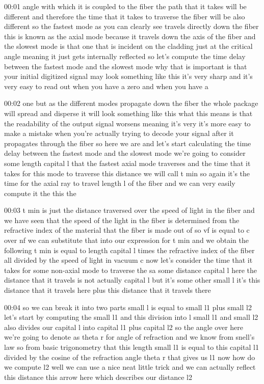 00:01
angle with which it is coupled to the fiber the path that it takes
will be different and therefore the time
that it takes to traverse the fiber will be also different
so the fastest mode as you can clearly see
travels directly down the fiber this is known as the axial mode
because it travels down the axis of the fiber and the slowest mode is
that one that is incident on the cladding just at the critical angle meaning it
just gets internally reflected so let's compute the time delay between
the fastest mode and the slowest mode why that is important is that your
initial digitized signal may look something like this it's very
sharp and it's very easy to read out when you have a zero and when you have a

00:02
one but as the different modes propagate down the fiber the whole
package will spread and disperse it will look something like this
what this means is that the readability of the output signal
worsens meaning it's very it's more easy to make a mistake
when you're actually trying to decode your signal after it propagates through
the fiber so here we are and let's start calculating the time delay between the
fastest mode and the slowest mode we're going to consider
some length capital l that the fastest axial mode traverses
and the time that it takes for this mode to traverse this distance
we will call t min so again it's the time for the axial ray to travel length
l of the fiber and we can very easily compute it the this the

00:03
t min is just the distance traversed over the speed
of light in the fiber and we have seen that the speed of the light in the fiber
is determined from the refractive index of the material
that the fiber is made out of so vf is equal to c over nf we can
substitute that into our expression for t min
and we obtain the following t min is equal to length
capital l times the refractive index of the fiber
all divided by the speed of light in vacuum c
now let's consider the time that it takes
for some non-axial mode to traverse the sa some distance capital l here
the distance that it travels is not actually capital l
but it's some other small l it's this distance that it
travels here plus this distance that it travels there

00:04
so we can break it into two parts small l is equal to small l1 plus small l2
let's start by computing the small l1 and this division into l small l1 and
small l2 also divides our capital l into capital l1 plus capital l2
so the angle over here we're going to denote as theta r for angle of refraction
and we know from snell's law so from basic trigonometry that this length small
l1 is equal to this capital l1 divided by the cosine of the refraction
angle theta r that gives us l1 now how do we compute
l2 well we can use a nice neat little trick and we can actually reflect
this distance this arrow here which describes our distance l2

